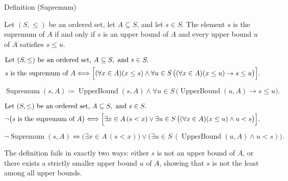 \begin{definitionbox}{Definition (Supremum)}
\begin{definition}[Supremum]
\label{def:supremum}
Let $(S,\le)$ be an ordered set, let $A \subseteq S$, and let $s \in S$. The element $s$ is the supremum of $A$ if and only if $s$ is an upper bound of $A$ and every upper bound $u$ of $A$ satisfies $s \le u$.
\end{definition}
\end{definitionbox}

\begin{remark*}
\[
\begin{aligned}
&\text{Let } (S,\le) \text{ be an ordered set, } A \subseteq S, \text{ and } s \in S.\\
&s \text{ is the supremum of } A \Longleftrightarrow \Bigl[(\forall x \in A)(x \le s) \land \forall u \in S\,\bigl((\forall x \in A)(x \le u) \rightarrow s \le u\bigr)\Bigr].
\end{aligned}
\]
\end{remark*}

\begin{remark*}
\[
\operatorname{Supremum}(s,A) \coloneqq \operatorname{UpperBound}(s,A) \land \forall u \in S\,\bigl(\operatorname{UpperBound}(u,A) \rightarrow s \le u\bigr).
\]
\end{remark*}

\begin{remark*}
\[
\begin{aligned}
&\text{Let } (S,\le) \text{ be an ordered set, } A \subseteq S, \text{ and } s \in S.\\
&\neg\bigl(s \text{ is the supremum of } A\bigr) \Longleftrightarrow \Bigl[\exists x \in A\, (s < x) \lor \exists u \in S\,\bigl((\forall x \in A)(x \le u) \land u < s\bigr)\Bigr].
\end{aligned}
\]
\end{remark*}

\begin{remark*}
\[
\neg\operatorname{Supremum}(s,A) \Longleftrightarrow \bigl(\exists x \in A\, (s < x)\bigr) \lor \bigl(\exists u \in S\,(\operatorname{UpperBound}(u,A) \land u < s)\bigr).
\]
\end{remark*}

\begin{remark*}
The definition fails in exactly two ways: either $s$ is not an upper bound of $A$, or there exists a strictly smaller upper bound $u$ of $A$, showing that $s$ is not the least among all upper bounds.
\end{remark*}

